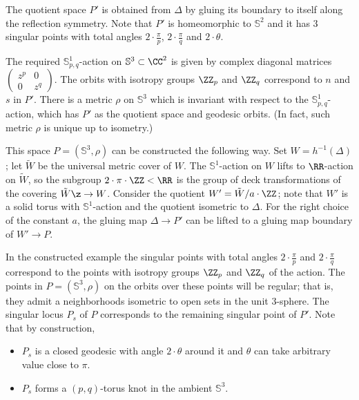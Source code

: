 The quotient space $P'$ is obtained from $\Delta$ by gluing its boundary to itself along the reflection symmetry.
Note that $P'$ is homeomorphic to $\mathbb S^2$ and
it has 3 singular points with total angles $2\cdot\tfrac\pi p$,
$2\cdot\tfrac\pi q$ and $2\cdot\theta$.

The required $\mathbb S^1_{p,q}$-action on $\mathbb{S}^3\subset\CC^2$ is given by complex diagonal matrices $\left(\begin{smallmatrix}z^p&0\\0&z^q\end{smallmatrix}\right)$.
The orbits with isotropy groups $\ZZ_p$ and $\ZZ_q$ correspond to $n$ and $s$ in $P'$.
There is a metric $\rho$ on  $\mathbb{S}^3$ which is invariant with respect to the $\mathbb S^1_{p,q}$-action, which has $P'$  as the quotient space and geodesic orbits. 
(In fact, such metric $\rho$ is unique up to isometry.)

This space $P=(\mathbb{S}^3,\rho)$ can be constructed the following way.
Set $W=h^{-1}(\Delta)$;
let $\tilde W$ be the universal metric cover of $W$.
The $\mathbb{S}^1$-action on $W$ lifts to $\RR$-action on $\tilde W$,
so the subgroup $2\cdot\pi\cdot\ZZ<\RR$ is the group of deck transformations of the covering $\tilde W\z\to W$. 
Consider the quotient $W'=\tilde W/a\cdot\ZZ$;
note that $W'$ is a solid torus with $\mathbb{S}^1$-action and the quotient isometric to $\Delta$.
For the right choice of the constant $a$, the gluing map $\Delta\to P'$ can be lifted to a gluing map boundary of $W'\to P$.



In the constructed example 
the singular points with total angles $2\cdot\tfrac\pi p$ and
$2\cdot\tfrac\pi q$
correspond to the points with isotropy groups $\ZZ_p$ and $\ZZ_q$ of the action.
The points in $P=(\mathbb{S}^3,\rho)$ on the orbits over these points will be regular; 
that is, they admit a neighborhoods isometric to open sets in the unit 3-sphere.
The singular locus $P_s$
of $P$ corresponds to the remaining singular point of $P'$.
Note that by construction,
\begin{itemize}
\item $P_s$ is a closed geodesic with angle $2\cdot\theta$ around it and $\theta$ can take arbitrary value close to $\pi$.
\item $P_s$ forms a $(p,q)$-torus knot in the ambient $\mathbb{S}^3$.
\end{itemize}
\qedsf






















